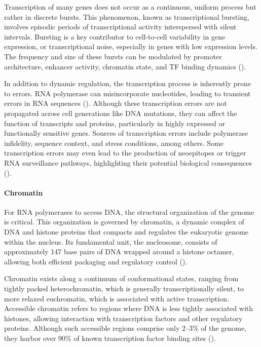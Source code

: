 Transcription of many genes does not occur as a continuous, uniform process but rather in discrete bursts.
This phenomenon, known as transcriptional bursting,
involves episodic periods of transcriptional activity interspersed with silent intervals.
Bursting is a key contributor to cell-to-cell variability in gene expression,
or transcriptional noise, especially in genes with low expression levels.
The frequency and size of these bursts can be modulated by promoter architecture,
enhancer activity, chromatin state, and TF binding dynamics (\cite{Hebenstreit2024}).

In addition to dynamic regulation, the transcription process is inherently prone to errors.
RNA polymerase can misincorporate nucleotides, leading to transient errors in RNA sequences (\cite{Gordon2015}).
Although these transcription errors are not propagated across cell generations like DNA mutations,
they can affect the function of transcripts and proteins, particularly in highly expressed or functionally sensitive genes.
Sources of transcription errors include polymerase infidelity, sequence context, and stress conditions, among others.
Some transcription errors may even lead to the production of neoepitopes or trigger RNA surveillance pathways,
highlighting their potential biological consequences (\cite{Sun2025}).

\paragraph{Chromatin}

For RNA polymerases to access DNA, the structural organization of the genome is critical.
This organization is governed by chromatin, a dynamic complex of DNA and histone proteins
that compacts and regulates the eukaryotic genome within the nucleus.
Its fundamental unit, the nucleosome, consists of approximately 147 base pairs of DNA wrapped around a histone octamer,
allowing both efficient packaging and regulatory control (\cite{Alberts2022}).

Chromatin exists along a continuum of conformational states, ranging from tightly packed heterochromatin,
which is generally transcriptionally silent, to more relaxed euchromatin, which is associated with active transcription.
Accessible chromatin refers to regions where DNA is less tightly associated with histones,
allowing interaction with transcription factors and other regulatory proteins.
Although such accessible regions comprise only 2–3\% of the genome,
they harbor over 90\% of known transcription factor binding sites (\cite{Klemm2019}).

